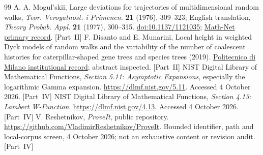 \documentclass[11pt,letterpaper]{article}
\numberwithin{equation}{section}
\theoremstyle{remark}\newtheorem{remark}[theorem]{Remark}
\begin{document}
\begin{thebibliography}{99}
 A. A. Mogul'skii, Large deviations for trajectories of multidimensional random walks, \emph{Teor. Veroyatnost. i Primenen.} \textbf{21} (1976), 309--323; English translation, \emph{Theory Probab. Appl.} \textbf{21} (1977), 300--315. \href{https://doi.org/10.1137/1121035}{doi:10.1137/1121035}; \href{https://www.mathnet.ru/eng/tvp3348}{Math-Net primary record}. [Part~II]
 F. Disanto and E. Munarini, Local height in weighted Dyck models of random walks and the variability of the number of coalescent histories for caterpillar-shaped gene trees and species trees (2019). \href{https://re.public.polimi.it/handle/11311/1088085}{Politecnico di Milano institutional record}; abstract inspected. [Part~II]
 NIST Digital Library of Mathematical Functions, \emph{Section 5.11: Asymptotic Expansions}, especially the logarithmic Gamma expansion. \url{https://dlmf.nist.gov/5.11}. Accessed 4 October 2026. [Part~IV]
 NIST Digital Library of Mathematical Functions, \emph{Section 4.13: Lambert W-Function}. \url{https://dlmf.nist.gov/4.13}. Accessed 4 October 2026. [Part~IV]
 V. Reshetnikov, \emph{ProveIt}, public repository. \url{https://github.com/VladimirReshetnikov/ProveIt}. Bounded identifier, path and local-corpus screen, 4 October 2026; not an exhaustive content or revision audit. [Part~IV]
\end{thebibliography}
\endgroup
\end{document}
